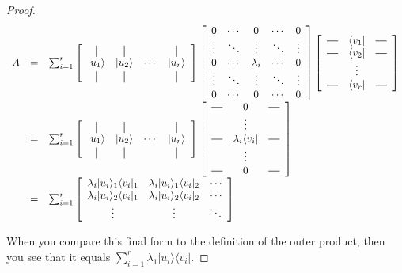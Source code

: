 \documentclass{amsbook}
\newcommand*{\vertbar}{\rule[-1ex]{0.5pt}{2.5ex}}
\newcommand*{\horzbar}{\rule[.5ex]{2.5ex}{0.5pt}}
\begin{document}
\begin{proof}
$$
\begin{array}{rcl}
A &=& \sum_{i=1}^r\left[
  \begin{array}{cccc}
    \vertbar & \vertbar & & \vertbar \\
    | u _1\rangle    & | u _2\rangle   & \cdots & | u _r\rangle    \\
    \vertbar & \vertbar & & \vertbar 
  \end{array}
\right] \left[\begin{array}{ccccc}
0 & \cdots & 0 & \cdots & 0 \\
\vdots & \ddots & \vdots & \ddots & \vdots \\
0 & \cdots & \lambda_i & \cdots & 0 \\
\vdots & \ddots & \vdots & \ddots & \vdots \\
0 & \cdots & 0 & \cdots & 0 \\
\end{array}\right]\left[
  \begin{array}{ccc}
    \horzbar & \langle v _1| & \horzbar \\
    \horzbar & \langle v _2|& \horzbar \\
             & \vdots    &          \\
    \horzbar & \langle v _r|& \horzbar
  \end{array}
\right] \\
&=& \sum_{i=1}^r\left[
  \begin{array}{cccc}
    \vertbar & \vertbar & & \vertbar \\
    | u _1\rangle    & | u _2\rangle   & \cdots & | u _r\rangle    \\
    \vertbar & \vertbar & & \vertbar 
  \end{array}
\right] \left[
  \begin{array}{ccc}
    \horzbar & 0 & \horzbar \\
             & \vdots    &          \\
    \horzbar & \lambda_i\langle v _i|& \horzbar \\
             & \vdots    &          \\
    \horzbar & 0& \horzbar
  \end{array}
\right] \\
&=& \sum_{i=1}^r\left[
  \begin{array}{ccc}
  \lambda_i| u _i\rangle_1\langle v _i|_1 & \lambda_i| u _i\rangle_1\langle v _i|_2 & \cdots \\
  \lambda_i| u _i\rangle_2\langle v _i|_1 & \lambda_i| u _i\rangle_2\langle v _i|_2 & \cdots \\
  \vdots & \vdots & \ddots
  \end{array}
\right] 
\end{array}
$$

\noindent
When you compare this final form to the definition of the outer product, then you see that it equals $\sum_{i=1}^r\lambda_1| u _i\rangle\langle v _i|$.
\end{proof}
\end{document}
